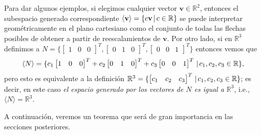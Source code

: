 \documentclass[12pt]{article}
\begin{document}
Para dar algunos ejemplos, si elegimos cualquier vector $\mathbf{v}\in\mathbb{R}^2$, entonces el subespacio generado correspondiente $\langle \mathbf{v} \rangle = \{c\mathbf{v}\hspace{0.5mm}|\hspace{0.5mm}c\in \mathbb{R}\}$ se puede interpretar geométricamente en el plano cartesiano como el conjunto de todas las flechas posibles de obtener a partir de reescalamientos de $\mathbf{v}$. Por otro lado, si en $\mathbb{R}^3$ definimos a $N=\{\begin{bmatrix} 1 & 0 & 0 \end{bmatrix}^T, \begin{bmatrix} 0 & 1 & 0 \end{bmatrix}^T, \begin{bmatrix} 0 & 0 & 1 \end{bmatrix}^T\}$ entonces vemos que $$\langle N \rangle = \{c_1\begin{bmatrix} 1 & 0 & 0 \end{bmatrix}^T + c_2\begin{bmatrix} 0 & 1 & 0 \end{bmatrix}^T + c_3\begin{bmatrix} 0 & 0 & 1 \end{bmatrix}^T\hspace{0.5mm}|\hspace{0.5mm}c_1,c_2,c_3\in\mathbb{R}\},$$ pero esto es equivalente a la definición $\mathbb{R}^3 = \{\begin{bmatrix} c_1 & c_2 & c_3\end{bmatrix}^T \hspace{0.5mm}|\hspace{0.5mm}c_1,c_2,c_3\in\mathbb{R}\}$; es decir, en este caso \emph{el espacio generado por los vectores de $N$ es igual a $\mathbb{R}^3$}, i.e., $\langle N \rangle =\mathbb{R}^3$.

A continuación, veremos un teorema que será de gran importancia en las secciones posteriores.
\end{document}
